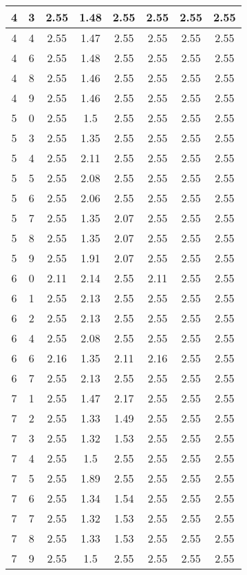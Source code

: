 \begin{longtable}{|c|c||c||c|c||c|c|c|}
	4 & 3 & 2.55 & 1.48 & 2.55 & 2.55 & 2.55 & 2.55 \\ \hline
	4 & 4 & 2.55 & 1.47 & 2.55 & 2.55 & 2.55 & 2.55 \\ \hline
	4 & 6 & 2.55 & 1.48 & 2.55 & 2.55 & 2.55 & 2.55 \\ \hline
	4 & 8 & 2.55 & 1.46 & 2.55 & 2.55 & 2.55 & 2.55 \\ \hline
	4 & 9 & 2.55 & 1.46 & 2.55 & 2.55 & 2.55 & 2.55 \\ \hline
	5 & 0 & 2.55 & 1.5 & 2.55 & 2.55 & 2.55 & 2.55 \\ \hline
	5 & 3 & 2.55 & 1.35 & 2.55 & 2.55 & 2.55 & 2.55 \\ \hline
	5 & 4 & 2.55 & 2.11 & 2.55 & 2.55 & 2.55 & 2.55 \\ \hline
	5 & 5 & 2.55 & 2.08 & 2.55 & 2.55 & 2.55 & 2.55 \\ \hline
	5 & 6 & 2.55 & 2.06 & 2.55 & 2.55 & 2.55 & 2.55 \\ \hline
	5 & 7 & 2.55 & 1.35 & 2.07 & 2.55 & 2.55 & 2.55 \\ \hline
	5 & 8 & 2.55 & 1.35 & 2.07 & 2.55 & 2.55 & 2.55 \\ \hline
	5 & 9 & 2.55 & 1.91 & 2.07 & 2.55 & 2.55 & 2.55 \\ \hline
	6 & 0 & 2.11 & 2.14 & 2.55 & 2.11 & 2.55 & 2.55 \\ \hline
	6 & 1 & 2.55 & 2.13 & 2.55 & 2.55 & 2.55 & 2.55 \\ \hline
	6 & 2 & 2.55 & 2.13 & 2.55 & 2.55 & 2.55 & 2.55 \\ \hline
	6 & 4 & 2.55 & 2.08 & 2.55 & 2.55 & 2.55 & 2.55 \\ \hline
	6 & 6 & 2.16 & 1.35 & 2.11 & 2.16 & 2.55 & 2.55 \\ \hline
	6 & 7 & 2.55 & 2.13 & 2.55 & 2.55 & 2.55 & 2.55 \\ \hline
	7 & 1 & 2.55 & 1.47 & 2.17 & 2.55 & 2.55 & 2.55 \\ \hline
	7 & 2 & 2.55 & 1.33 & 1.49 & 2.55 & 2.55 & 2.55 \\ \hline
	7 & 3 & 2.55 & 1.32 & 1.53 & 2.55 & 2.55 & 2.55 \\ \hline
	7 & 4 & 2.55 & 1.5 & 2.55 & 2.55 & 2.55 & 2.55 \\ \hline
	7 & 5 & 2.55 & 1.89 & 2.55 & 2.55 & 2.55 & 2.55 \\ \hline
	7 & 6 & 2.55 & 1.34 & 1.54 & 2.55 & 2.55 & 2.55 \\ \hline
	7 & 7 & 2.55 & 1.32 & 1.53 & 2.55 & 2.55 & 2.55 \\ \hline
	7 & 8 & 2.55 & 1.33 & 1.53 & 2.55 & 2.55 & 2.55 \\ \hline
	7 & 9 & 2.55 & 1.5 & 2.55 & 2.55 & 2.55 & 2.55 \\ \hline
\end{longtable}
